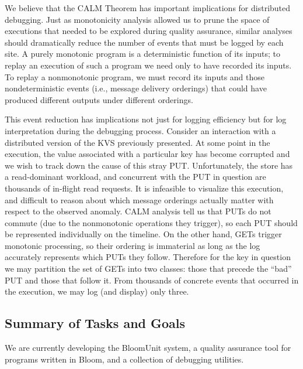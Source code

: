 We believe that the CALM Theorem has important implications for distributed debugging.
Just as monotonicity analysis allowed us to prune the space of executions that needed to be
explored during quality assurance, similar analyses should dramatically reduce the number of events
that must be logged by each site.  A purely monotonic program is a deterministic function of its inputs;
to replay an execution of such a program we need only to have recorded its inputs.  To replay a nonmonotonic 
program, we must record its inputs and those nondeterministic events (i.e., message delivery orderings) 
that could have produced different outputs under different orderings.  

This event reduction has implications not just for logging efficiency but for log interpretation during
the debugging process.  Consider an interaction with a distributed version of the KVS previously presented.
At some point in the execution, the value associated with a particular key has become corrupted and we wish
to track down the cause of this stray PUT.  Unfortunately, the store has a read-dominant workload, and concurrent 
with the PUT in question are thousands of in-flight read requests.  It is infeasible to visualize this execution,
and difficult to reason about which message orderings actually matter with respect to the observed anomaly.
CALM analysis tell us that PUTs do not commute (due to the nonmonotonic operations they trigger), so each PUT
should be represented individually on the timeline.  On the other hand, GETs trigger monotonic processing, so
their ordering is immaterial as long as the log accurately represents which PUTs they follow.
Therefore for the key in question we may partition the set of GETs into two classes: those that precede the ``bad''
PUT and those that follow it.  From thousands of concrete events that occurred in the execution, we may log (and
display) only three.



\subsection{Summary of Tasks and Goals}

We are currently developing the BloomUnit system, a quality assurance tool
for programs written in Bloom, and a collection of debugging utilities.

